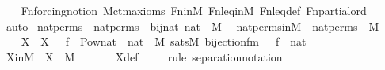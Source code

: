 \begin{isabellebody}
\ \ \isamarkupfalse%
\ Fn{\isacharunderscore}{\kern0pt}forcing{\isacharunderscore}{\kern0pt}notion\ M{\isacharunderscore}{\kern0pt}ctm{\isacharunderscore}{\kern0pt}axioms\ Fn{\isacharunderscore}{\kern0pt}in{\isacharunderscore}{\kern0pt}M\ Fn{\isacharunderscore}{\kern0pt}leq{\isacharunderscore}{\kern0pt}in{\isacharunderscore}{\kern0pt}M\ Fn{\isacharunderscore}{\kern0pt}leq{\isacharunderscore}{\kern0pt}def\ Fn{\isacharunderscore}{\kern0pt}partial{\isacharunderscore}{\kern0pt}ord\isanewline
\ \ \isamarkupfalse%
\ auto%
\endisatagproof
{\isafoldproof}%
%
\isadelimproof
\isanewline
%
\endisadelimproof
\isanewline
{}\isamarkupfalse%
\ nat{\isacharunderscore}{\kern0pt}perms\ \ {\isachardoublequoteopen}nat{\isacharunderscore}{\kern0pt}perms\ {\isasymequiv}\ bij{\isacharparenleft}{\kern0pt}nat{\isacharcomma}{\kern0pt}\ nat{\isacharparenright}{\kern0pt}\ {\isasyminter}\ M{\isachardoublequoteclose}\ \isanewline
\isanewline
{}\isamarkupfalse%
\ nat{\isacharunderscore}{\kern0pt}perms{\isacharunderscore}{\kern0pt}in{\isacharunderscore}{\kern0pt}M\ {\isacharcolon}{\kern0pt}\ {\isachardoublequoteopen}nat{\isacharunderscore}{\kern0pt}perms\ {\isasymin}\ M{\isachardoublequoteclose}\ \isanewline
%
\isadelimproof
%
\endisadelimproof
%
\isatagproof
{}\isamarkupfalse%
\ {\isacharminus}{\kern0pt}\ \isanewline
\ \ \isamarkupfalse%
\ X\ \ {\isachardoublequoteopen}X\ {\isasymequiv}\ {\isacharbraceleft}{\kern0pt}\ f\ {\isasymin}\ Pow{\isacharparenleft}{\kern0pt}nat\ {\isasymtimes}\ nat{\isacharparenright}{\kern0pt}\ {\isasyminter}\ M{\isachardot}{\kern0pt}\ sats{\isacharparenleft}{\kern0pt}M{\isacharcomma}{\kern0pt}\ bijection{\isacharunderscore}{\kern0pt}fm{\isacharparenleft}{\kern0pt}{}{\isacharcomma}{\kern0pt}\ {}{\isacharcomma}{\kern0pt}\ {}{\isacharparenright}{\kern0pt}{\isacharcomma}{\kern0pt}\ {\isacharbrackleft}{\kern0pt}f{\isacharbrackright}{\kern0pt}\ {\isacharat}{\kern0pt}\ {\isacharbrackleft}{\kern0pt}nat{\isacharbrackright}{\kern0pt}{\isacharparenright}{\kern0pt}\ {\isacharbraceright}{\kern0pt}{\isachardoublequoteclose}\ \isanewline
\isanewline
\ \ \isamarkupfalse%
\ XinM\ {\isacharcolon}{\kern0pt}\ {\isachardoublequoteopen}X\ {\isasymin}\ M{\isachardoublequoteclose}\ \isanewline
\ \ \ \ \isamarkupfalse%
\ X{\isacharunderscore}{\kern0pt}def\isanewline
\ \ \ \ \isamarkupfalse%
{\isacharparenleft}{\kern0pt}rule\ separation{\isacharunderscore}{\kern0pt}notation{\isacharparenright}{\kern0pt}\isanewline

\end{isabellebody}
